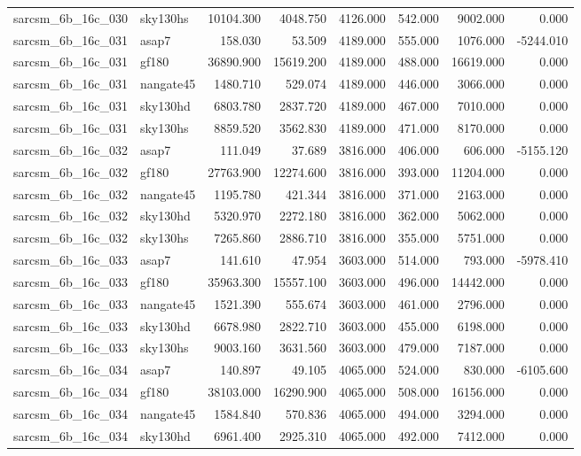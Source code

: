 \begin{tabular}{llrrrrrr}
sarcsm\_6b\_16c\_030 & sky130hs & 10104.300 & 4048.750 & 4126.000 & 542.000 & 9002.000 & 0.000 \\
sarcsm\_6b\_16c\_031 & asap7 & 158.030 & 53.509 & 4189.000 & 555.000 & 1076.000 & -5244.010 \\
sarcsm\_6b\_16c\_031 & gf180 & 36890.900 & 15619.200 & 4189.000 & 488.000 & 16619.000 & 0.000 \\
sarcsm\_6b\_16c\_031 & nangate45 & 1480.710 & 529.074 & 4189.000 & 446.000 & 3066.000 & 0.000 \\
sarcsm\_6b\_16c\_031 & sky130hd & 6803.780 & 2837.720 & 4189.000 & 467.000 & 7010.000 & 0.000 \\
sarcsm\_6b\_16c\_031 & sky130hs & 8859.520 & 3562.830 & 4189.000 & 471.000 & 8170.000 & 0.000 \\
sarcsm\_6b\_16c\_032 & asap7 & 111.049 & 37.689 & 3816.000 & 406.000 & 606.000 & -5155.120 \\
sarcsm\_6b\_16c\_032 & gf180 & 27763.900 & 12274.600 & 3816.000 & 393.000 & 11204.000 & 0.000 \\
sarcsm\_6b\_16c\_032 & nangate45 & 1195.780 & 421.344 & 3816.000 & 371.000 & 2163.000 & 0.000 \\
sarcsm\_6b\_16c\_032 & sky130hd & 5320.970 & 2272.180 & 3816.000 & 362.000 & 5062.000 & 0.000 \\
sarcsm\_6b\_16c\_032 & sky130hs & 7265.860 & 2886.710 & 3816.000 & 355.000 & 5751.000 & 0.000 \\
sarcsm\_6b\_16c\_033 & asap7 & 141.610 & 47.954 & 3603.000 & 514.000 & 793.000 & -5978.410 \\
sarcsm\_6b\_16c\_033 & gf180 & 35963.300 & 15557.100 & 3603.000 & 496.000 & 14442.000 & 0.000 \\
sarcsm\_6b\_16c\_033 & nangate45 & 1521.390 & 555.674 & 3603.000 & 461.000 & 2796.000 & 0.000 \\
sarcsm\_6b\_16c\_033 & sky130hd & 6678.980 & 2822.710 & 3603.000 & 455.000 & 6198.000 & 0.000 \\
sarcsm\_6b\_16c\_033 & sky130hs & 9003.160 & 3631.560 & 3603.000 & 479.000 & 7187.000 & 0.000 \\
sarcsm\_6b\_16c\_034 & asap7 & 140.897 & 49.105 & 4065.000 & 524.000 & 830.000 & -6105.600 \\
sarcsm\_6b\_16c\_034 & gf180 & 38103.000 & 16290.900 & 4065.000 & 508.000 & 16156.000 & 0.000 \\
sarcsm\_6b\_16c\_034 & nangate45 & 1584.840 & 570.836 & 4065.000 & 494.000 & 3294.000 & 0.000 \\
sarcsm\_6b\_16c\_034 & sky130hd & 6961.400 & 2925.310 & 4065.000 & 492.000 & 7412.000 & 0.000 \\

\end{tabular}
